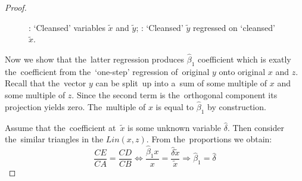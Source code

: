 \begin{proof}
\begin{figure}[ht!]
\begin{center}
\caption{: `Cleansed' variables $\tilde x$ and $\tilde y$;
: `Cleansed' $\tilde y$ regressed on `cleansed' $\tilde{x}$.}
\end{center}
\end{figure}

Now we show that the~latter regression produces $\hat \beta_1$ coefficient which
is exatly the~coefficient from the~`one-step' regression of~original $y$ onto
original $x$ and $z$. Recall that the~vector $y$ can be split~up into a~sum of
some multiple of $x$ and some multiple of $z$. Since the second term is
the~orthogonal component its projection yields zero. The~multiple of $x$
is equal to $\hat \beta_1$ by construction.

Assume that the~coefficient at~$\tilde x$ is some unknown variable $\hat \delta$.
Then consider the~similar triangles in the $Lin(x,z)$. From the~proportions
we obtain:
\[
\frac{CE}{CA} = \frac{CD}{CB} \Leftrightarrow \frac{\hat \beta_1 x}{x} = \frac{\hat \delta \tilde x}{\tilde x} \Rightarrow \hat \beta_1 = \hat \delta
\]


\end{proof}

